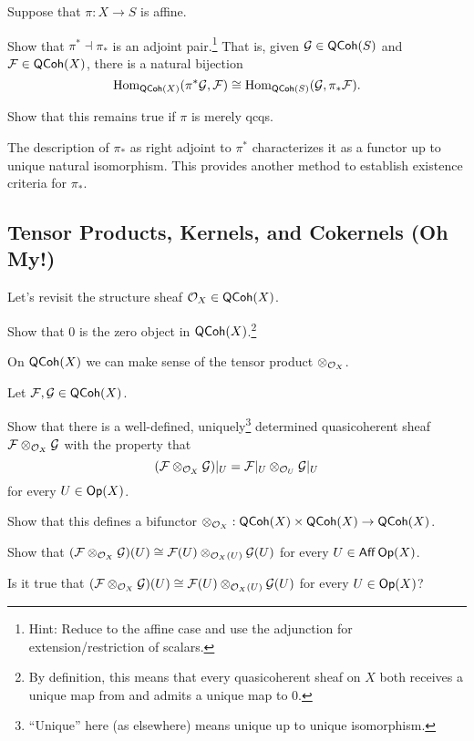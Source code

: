 \documentclass[11pt]{article}
\renewcommand{\F}{\mathcal{F}}
\newcommand{\G}{\mathcal{G}}
\begin{document}
\begin{exercise}
Suppose that $\pi: X\to S$ is affine. 
\begin{enum}{\alph}
\item Show that $\pi^*\dashv\pi_*$ is an adjoint pair.\footnote{Hint: Reduce to the affine case and use the adjunction for extension/restriction of scalars.} That is, given $\G\in\QCoh(S)$ and $\F\in\QCoh(X)$, there is a natural bijection
$$\Hom_{\QCoh(X)}(\pi^*\G,\F)\iso\Hom_{\QCoh(S)}(\G,\pi_*\F).$$

\item Show that this remains true if $\pi$ is merely qcqs.
\end{enum}
\end{exercise}

The description of $\pi_*$ as right adjoint to $\pi^*$ characterizes it as a functor up to unique natural isomorphism. This provides another method to establish existence criteria for $\pi_*$.

\subsection{Tensor Products, Kernels, and Cokernels (Oh My!)}
Let's revisit the structure sheaf $\mathcal{O}_X\in\operatorname{\mathsf{QCoh}}(X)$. 

\begin{exercise}
Show that $0$ is the zero object in $\operatorname{\mathsf{QCoh}}(X)$.\footnote{By definition, this means that every quasicoherent sheaf on $X$ both receives a unique map from and admits a unique map to $0$.}
\end{exercise}

On $\operatorname{\mathsf{QCoh}}(X)$ we can make sense of the tensor product $\otimes_{\mathcal{O}_X}$. 

\begin{exercise}
Let $\F,\G\in\QCoh(X)$. 
\begin{enum}{\arabic}
\item Show that there is a well-defined, uniquely\footnote{``Unique'' here (as elsewhere) means unique up to unique isomorphism.} determined quasicoherent sheaf $\F\tensor_{\O_X}\G$ with the property that 
$$(\F\tensor_{\O_X}\G)|_U=\F|_U\tensor_{\O_U}\G|_U$$ 
for every $U\in\operatorname{\mathsf{Op}}(X)$.

\item Show that this defines a bifunctor $\otimes_{\mathcal{O}_X}: \operatorname{\mathsf{QCoh}}(X)\times\operatorname{\mathsf{QCoh}}(X)\to\operatorname{\mathsf{QCoh}}(X)$.

\item Show that $(\F\tensor_{\O_X}\G)(U)\iso\F(U)\tensor_{\O_X(U)}\G(U)$ for every $U\in\operatorname{\mathsf{Aff}}\operatorname{\mathsf{Op}}(X)$.

\item Is it true that $(\F\tensor_{\O_X}\G)(U)\iso\F(U)\tensor_{\O_X(U)}\G(U)$ for every $U\in\operatorname{\mathsf{Op}}(X)$?
\end{enum}
\end{exercise}
\end{document}
